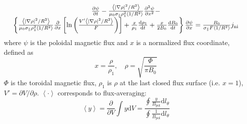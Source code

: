 \begin{equation}
\begin{array}{*{20}{c}}
{\frac{{\partial \psi }}{{\partial t}} - \frac{{\left\langle {{{\left| {\nabla \rho } \right|}^2}/{R^2}} \right\rangle }}{{{\mu _0}{\sigma _\parallel }\rho _{\rm{1}}^2\left\langle {1/{R^2}} \right\rangle }}\frac{{{\partial ^2}\psi }}{{\partial {x^2}}} - }\\
{\left\{ {\frac{{\left\langle {{{\left| {\nabla \rho } \right|}^2}/{R^2}} \right\rangle }}{{{\mu _0}{\sigma _\parallel }\rho _{\rm{1}}^2\left\langle {1/{R^2}} \right\rangle }}\frac{\partial }{{\partial x}}\left[ {\ln \left( {\frac{{V'\left\langle {{{\left| {\nabla \rho } \right|}^2}{\rm{/}}{R^2}} \right\rangle }}{F}} \right)} \right] + \frac{x}{{{\rho _{\rm{1}}}}}\frac{{{\rm{d}}{\rho _{\rm{1}}}}}{{{\rm{d}}t}} + \frac{x}{{2{B_0}}}\frac{{{\rm{d}}{B_0}}}{{{\rm{d}}t}}} \right\}\frac{{\partial \psi }}{{\partial x}} = \frac{{{B_0}}}{{{\sigma _\parallel }F\left\langle {1{\rm{/}}{R^2}} \right\rangle }}{j_{{\rm{ni}}}}}
\end{array}
\end{equation}
where
$\psi$ is the poloidal magnetic flux and $x$ is a normalized flux coordinate, defined as
\begin{equation}
x = \frac{\rho }{{{\rho _{{\text{1}}}}}},\quad \rho  = \sqrt {\frac{\Phi }{{\pi {B_0}}}} 
\end{equation}
$\Phi$ is the toroidal magnetic flux, $\rho_1$ is $\rho$ at the last closed flux surface (i.e. $x=1$), $V' = \partial V / \partial \rho$.
$\left\langle \cdot \right\rangle$ corresponds to flux-averaging:
\begin{equation}
\left\langle y \right\rangle  = \frac{\partial }{{\partial V}}\int {y{\text{d}}V}  = \frac{{\oint {\frac{y}{{{B_{{\text{pol}}}}}}{\text{d}}{l_\theta }} }}{{\oint {\frac{1}{{{B_{{\text{pol}}}}}}{\text{d}}{l_\theta }} }}
\end{equation}

